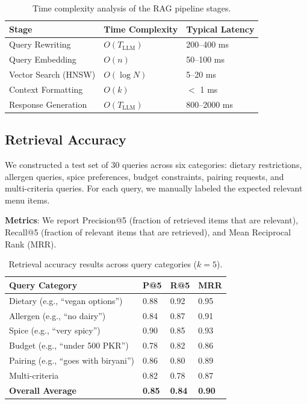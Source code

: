\begin{table}[width=.9\linewidth,cols=3,pos=h]
\caption{Time complexity analysis of the RAG pipeline stages.}\label{tbl:complexity}
\begin{tabular*}{\tblwidth}{@{}LLL@{}}
\toprule
Stage & Time Complexity & Typical Latency \\
\midrule
Query Rewriting & $O(T_{\text{LLM}})$ & 200--400 ms \\
Query Embedding & $O(n)$ & 50--100 ms \\
Vector Search (HNSW) & $O(\log N)$ & 5--20 ms \\
Context Formatting & $O(k)$ & $<$ 1 ms \\
Response Generation & $O(T_{\text{LLM}})$ & 800--2000 ms \\
\bottomrule
\end{tabular*}
\end{table}

\subsection{Retrieval Accuracy}

We constructed a test set of 30 queries across six categories: dietary restrictions, allergen queries, spice preferences, budget constraints, pairing requests, and multi-criteria queries. For each query, we manually labeled the expected relevant menu items.

\textbf{Metrics}: We report Precision@5 (fraction of retrieved items that are relevant), Recall@5 (fraction of relevant items that are retrieved), and Mean Reciprocal Rank (MRR).

\begin{table}[width=.9\linewidth,cols=4,pos=h]
\caption{Retrieval accuracy results across query categories ($k=5$).}\label{tbl:retrieval}
\begin{tabular*}{\tblwidth}{@{}LLLL@{}}
\toprule
Query Category & P@5 & R@5 & MRR \\
\midrule
Dietary (e.g., ``vegan options'') & 0.88 & 0.92 & 0.95 \\
Allergen (e.g., ``no dairy'') & 0.84 & 0.87 & 0.91 \\
Spice (e.g., ``very spicy'') & 0.90 & 0.85 & 0.93 \\
Budget (e.g., ``under 500 PKR'') & 0.78 & 0.82 & 0.86 \\
Pairing (e.g., ``goes with biryani'') & 0.86 & 0.80 & 0.89 \\
Multi-criteria & 0.82 & 0.78 & 0.87 \\
\midrule
\textbf{Overall Average} & \textbf{0.85} & \textbf{0.84} & \textbf{0.90} \\
\bottomrule
\end{tabular*}
\end{table}

